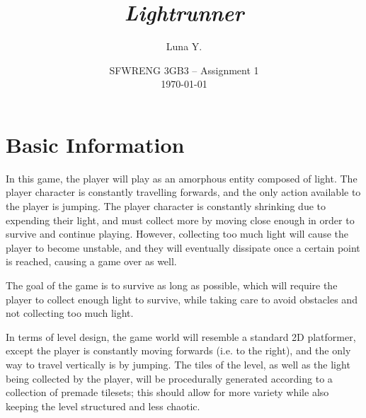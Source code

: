 \documentclass[10pt]{article}
\begin{document}
\title{\textit{Lightrunner}}
\author{Luna Y.}
\date{
    SFWRENG 3GB3 -- Assignment 1\\[0.25cm]
    \today
}
\maketitle

\tableofcontents

\section{Basic Information}

In this game, the player will play as an amorphous entity composed of light. The player character is constantly travelling forwards,
and the only action available to the player is jumping. The player character is constantly shrinking due to expending their light,
and must collect more by moving close enough in order to survive and continue playing. However, collecting too much light will
cause the player to become unstable, and they will eventually dissipate once a certain point is reached, causing a game over as well.

The goal of the game is to survive as long as possible, which will require the player to collect enough light to survive,
while taking care to avoid obstacles and not collecting too much light.

In terms of level design, the game world will resemble a standard 2D platformer, except the player is constantly moving forwards (i.e. to the right),
and the only way to travel vertically is by jumping. The tiles of the level, as well as the light being collected by the player,
will be procedurally generated according to a collection of premade tilesets; this should allow for more variety while also keeping
the level structured and less chaotic.
\end{document}
